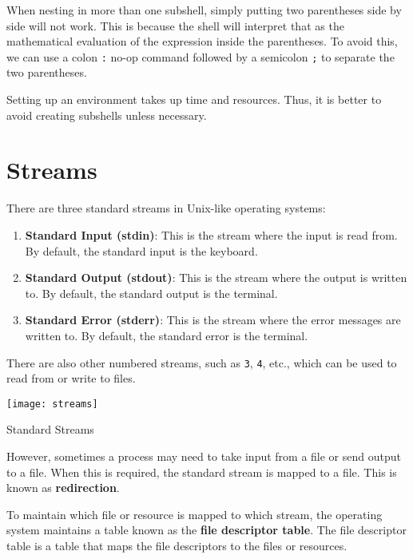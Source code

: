 \begin{remark}
  When nesting in more than one subshell, simply putting two parentheses
  side by side will not work. This is because the shell will interpret
  that as the mathematical evaluation of the expression inside the
  parentheses. To avoid this, we can use a colon \texttt{:} no-op command
  followed by a semicolon \texttt{;} to separate the two parentheses.
\end{remark}

\begin{remark}
  Setting up an environment takes up time and resources. Thus, it is
  better to avoid creating subshells unless necessary.
\end{remark}

\vfill
\pagebreak
\section{Streams}

There are three standard streams in Unix-like operating systems:

\begin{enumerate}
  \item \textbf{Standard Input (stdin)}: This is the stream where the
    input is read from. By default, the standard input is the keyboard.
  \item \textbf{Standard Output (stdout)}: This is the stream where the
    output is written to. By default, the standard output is the terminal.
  \item \textbf{Standard Error (stderr)}: This is the stream where the
    error messages are written to. By default, the standard error is the
    terminal.
\end{enumerate}

There are also other numbered streams, such as \texttt{3}, \texttt{4},
etc., which can be used to read from or write to files.

\begin{marginfigure}
  \texttt{[image: streams]}
  \caption{Standard Streams}
\end{marginfigure}

However, sometimes a process may need to take input from a file or
send output to a file. When this is required, the standard stream is
mapped to a file. This is known as \textbf{redirection}.

To maintain which file or resource is mapped to which stream, the
operating system maintains a table known as the \textbf{file descriptor
table}. The file descriptor table is a table that maps the file
descriptors to the files or resources.

